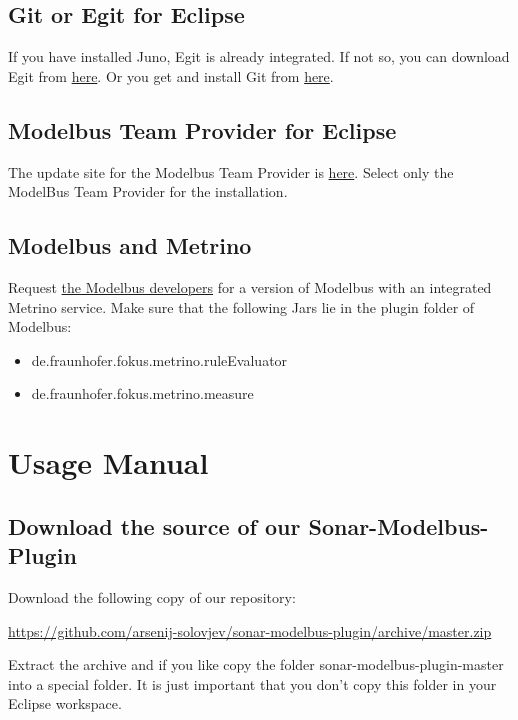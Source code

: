 \subsection{Git or Egit for Eclipse}
If you have installed Juno, Egit is already integrated. If not so, you can download Egit from \href{http://download.eclipse.org/egit/updates}{here}. Or you get and install Git from \href{http://git-scm.com/download/}{here}.
	


\subsection{Modelbus Team Provider for Eclipse}
The update site for the Modelbus Team Provider is \href{http://www.modelbus.org/modelbus/downloads/current/site}{here}. Select only the ModelBus Team Provider for the installation.



\subsection{Modelbus and Metrino}
Request \href{http://www.modelbus.org/modelbus/}{the Modelbus developers} for a version of Modelbus with an integrated Metrino service. Make sure that the following Jars lie in the plugin folder of Modelbus:
\begin{itemize}
	\item de.fraunhofer.fokus.metrino.ruleEvaluator
	\item de.fraunhofer.fokus.metrino.measure
\end{itemize}



\section{Usage Manual}



\subsection{Download the source of our Sonar-Modelbus-Plugin}
Download the following copy of our repository:

\url{https://github.com/arsenij-solovjev/sonar-modelbus-plugin/archive/master.zip}

Extract the archive and if you like copy the folder sonar-modelbus-plugin-master into a special folder. It is just important that you don't copy this folder in your Eclipse workspace.




